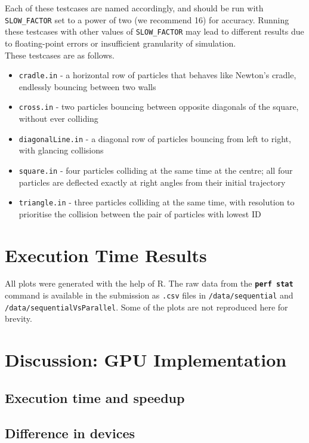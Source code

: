 \documentclass[12pt]{article}
\newcommand{\bt}[1]{\texttt{\textbf{#1}}}
\begin{document}
Each of these testcases are named accordingly, and should be run with \texttt{SLOW\_FACTOR} set to a power of two (we recommend 16) for accuracy. Running these testcases with other values of \texttt{SLOW\_FACTOR} may lead to different results due to floating-point errors or insufficient granularity of simulation. \\

These testcases are as follows.

\begin{itemize}
	\item \texttt{cradle.in} - a horizontal row of particles that behaves like Newton’s cradle, endlessly bouncing between two walls
	\item \texttt{cross.in} - two particles bouncing between opposite diagonals of the square, without ever colliding
	\item \texttt{diagonalLine.in} - a diagonal row of particles bouncing from left to right, with glancing collisions
	\item \texttt{square.in} - four particles colliding at the same time at the centre; all four particles are deflected exactly at right angles from their initial trajectory
	\item \texttt{triangle.in} - three particles colliding at the same time, with resolution to prioritise the collision between the pair of particles with lowest ID
\end{itemize}

\pagebreak

\section{Execution Time Results}

All plots were generated with the help of R. The raw data from the \bt{perf stat} command is available in the submission as \texttt{.csv} files in \texttt{/data/sequential} and \texttt{/data/sequentialVsParallel}. Some of the plots are not reproduced here for brevity. %


\pagebreak

\section{Discussion: GPU Implementation}


\subsection{Execution time and speedup}

\subsection{Difference in devices}
\end{document}
